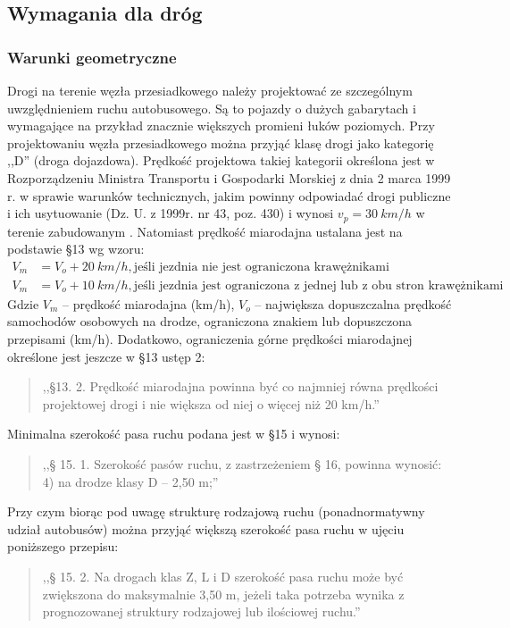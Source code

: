 \documentclass[twoside,12pt]{article}
\begin{document}
	\clearpage
	\subsection{Wymagania dla dróg}
	
	\subsubsection{Warunki geometryczne}
	
	Drogi na terenie węzła przesiadkowego należy projektować ze szczególnym uwzględnieniem ruchu autobusowego. Są to pojazdy o dużych gabarytach i wymagające na przykład znacznie większych promieni łuków poziomych. Przy projektowaniu węzła przesiadkowego można przyjąć klasę drogi jako kategorię ,,D'' (droga dojazdowa). Prędkość projektowa takiej kategorii określona jest w Rozporządzeniu Ministra Transportu i Gospodarki Morskiej z dnia 2 marca 1999 r. w sprawie warunków technicznych, jakim powinny odpowiadać drogi publiczne i ich usytuowanie (Dz. U. z 1999r. nr 43, poz. 430) i wynosi $v_p=30\ \si{km/h}$ w terenie zabudowanym \cite{rozporzadzenie_drogi}.  Natomiast prędkość miarodajna ustalana jest na podstawie §13 \cite{rozporzadzenie_drogi} wg wzoru:
	\begin{align*}
	V_m &= V_o + 20\ \si{km/h}, \text{jeśli jezdnia nie jest ograniczona krawężnikami}\\
	V_m &= V_o + 10\ \si{km/h}, \text{jeśli jezdnia jest ograniczona z jednej lub z obu stron krawężnikami}
	\end{align*}
	Gdzie $V_m$ -- prędkość miarodajna (km/h), $V_o$ -- największa dopuszczalna prędkość samochodów osobowych na drodze, ograniczona znakiem lub dopuszczona przepisami (km/h). Dodatkowo, ograniczenia górne prędkości miarodajnej określone jest jeszcze w §13 ustęp 2:
	\begin{quote}
	 ,,§13. 2. Prędkość miarodajna powinna być co najmniej równa prędkości projektowej drogi i nie większa od niej o więcej niż
20 km/h.'' \cite{rozporzadzenie_drogi}
	\end{quote}
	
	Minimalna szerokość pasa ruchu podana jest w §15 i wynosi:
	\begin{quote}
	,,§ 15. 1. Szerokość pasów ruchu, z zastrzeżeniem § 16, powinna wynosić:\\
	4) na drodze klasy D – 2,50 m;'' \cite{rozporzadzenie_drogi}
	\end{quote}
	
	Przy czym biorąc pod uwagę strukturę rodzajową ruchu (ponadnormatywny udział autobusów) można przyjąć większą szerokość pasa ruchu w ujęciu poniższego przepisu:
	\begin{quote}
	,,§ 15. 2. Na drogach klas Z, L i D szerokość pasa ruchu może być zwiększona do maksymalnie 3,50 m, jeżeli taka potrzeba
wynika z prognozowanej struktury rodzajowej lub ilościowej ruchu.'' \cite{rozporzadzenie_drogi}
	\end{quote}
	
\end{document}

